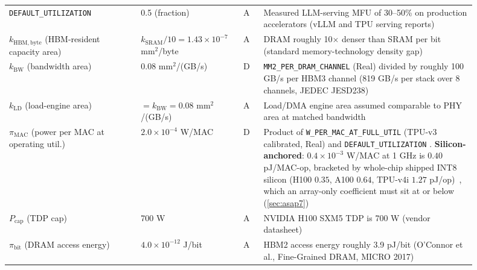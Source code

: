 \begin{table}[!htb]
\begin{tabular}{@{}p{0.26\linewidth}p{0.17\linewidth}p{0.045\linewidth}p{0.42\linewidth}@{}}
\texttt{DEFAULT\_\allowbreak UTILIZATION} & 0.5 (fraction) & A & Measured LLM-serving MFU of 30--50\% on production accelerators (vLLM and TPU serving reports) \citep{kwon2023vllm,pope2023efficiently} \\
$k_{\mathrm{HBM,byte}}$ (HBM-resident capacity area) & $k_{\mathrm{SRAM}}/10 = 1.43\times10^{-7}$ $\mathrm{mm}^2$/byte & A & DRAM roughly 10$\times$ denser than SRAM per bit (standard memory-technology density gap)~\citep{hennessy2017caqa} \\
$k_{\mathrm{BW}}$ (bandwidth area) & 0.08 $\mathrm{mm}^2$/(GB/s) & D & \texttt{MM2\_\allowbreak PER\_\allowbreak DRAM\_\allowbreak CHANNEL} (Real) divided by roughly 100 GB/s per HBM3 channel (819 GB/s per stack over 8 channels, JEDEC JESD238)~\citep{jedec2022hbm3} \\
$k_{\mathrm{LD}}$ (load-engine area) & $= k_{\mathrm{BW}} = 0.08$ $\mathrm{mm}^2$/(GB/s) & A & Load/DMA engine area assumed comparable to PHY area at matched bandwidth \\
$\pi_{\mathrm{MAC}}$ (power per MAC at operating util.) & $2.0\times10^{-4}$ W/MAC & D & Product of \texttt{W\_\allowbreak PER\_\allowbreak MAC\_\allowbreak AT\_\allowbreak FULL\_\allowbreak UTIL} (TPU-v3 calibrated, Real) and \texttt{DEFAULT\_\allowbreak UTILIZATION} \citep{jouppi2021ten}. \textbf{Silicon-anchored}: $0.4\times10^{-3}$ W/MAC at 1 GHz is $0.40$ pJ/MAC-op, bracketed by whole-chip shipped INT8 silicon (H100 $0.35$, A100 $0.64$, TPU-v4i $1.27$ pJ/op)~\citep{nvidia2022hopper,jouppi2021ten}, which an array-only coefficient must sit at or below (\cref{sec:asap7}) \\
$P_{\mathrm{cap}}$ (TDP cap) & 700 W & A & NVIDIA H100 SXM5 TDP is 700 W (vendor datasheet)~\citep{nvidia2022hopper} \\
$\pi_{\mathrm{bit}}$ (DRAM access energy) & $4.0\times10^{-12}$ J/bit & A & HBM2 access energy roughly 3.9 pJ/bit (O'Connor et al., Fine-Grained DRAM, MICRO 2017)~\citep{oconnor2017finegrained} \\
\bottomrule
\end{tabular}

\end{table}
